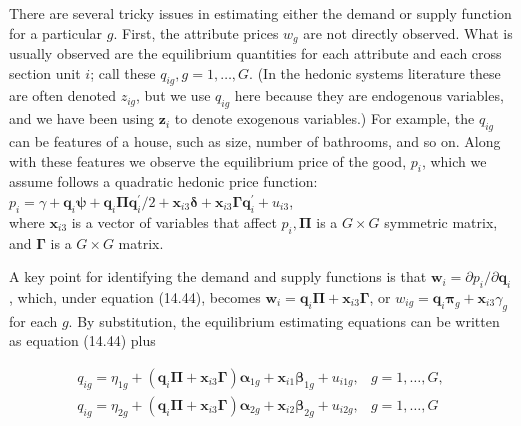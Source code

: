 \documentclass[10pt]{article}
\begin{document}
There are several tricky issues in estimating either the demand or supply function for a particular $g$. First, the attribute prices $w_{g}$ are not directly observed. What is usually observed are the equilibrium quantities for each attribute and each cross section unit $i$; call these $q_{i g}, g=1, \ldots, G$. (In the hedonic systems literature these are often denoted $z_{i g}$, but we use $q_{i g}$ here because they are endogenous variables, and we have been using $\mathbf{z}_{i}$ to denote exogenous variables.) For example, the $q_{i g}$ can be features of a house, such as size, number of bathrooms, and so on. Along with these features we observe the equilibrium price of the good, $p_{i}$, which we assume follows a quadratic hedonic price function:\\
$p_{i}=\gamma+\mathbf{q}_{i} \boldsymbol{\psi}+\mathbf{q}_{i} \boldsymbol{\Pi} \mathbf{q}_{i}^{\prime} / 2+\mathbf{x}_{i 3} \boldsymbol{\delta}+\mathbf{x}_{i 3} \boldsymbol{\Gamma} \mathbf{q}_{i}^{\prime}+u_{i 3}$,\\
where $\mathbf{x}_{i 3}$ is a vector of variables that affect $p_{i}, \boldsymbol{\Pi}$ is a $G \times G$ symmetric matrix, and $\boldsymbol{\Gamma}$ is a $G \times G$ matrix.

A key point for identifying the demand and supply functions is that $\mathbf{w}_{i}=\partial p_{i} / \partial \mathbf{q}_{i}$, which, under equation (14.44), becomes $\mathbf{w}_{i}=\mathbf{q}_{i} \boldsymbol{\Pi}+\mathbf{x}_{i 3} \boldsymbol{\Gamma}$, or $w_{i g}=\mathbf{q}_{i} \boldsymbol{\pi}_{g}+\mathbf{x}_{i 3} \gamma_{g}$ for each $g$. By substitution, the equilibrium estimating equations can be written as equation (14.44) plus

\[
\begin{array}{ll}
q_{i g}=\eta_{1 g}+\left(\mathbf{q}_{i} \boldsymbol{\Pi}+\mathbf{x}_{i 3} \boldsymbol{\Gamma}\right) \boldsymbol{\alpha}_{1 g}+\mathbf{x}_{i 1} \boldsymbol{\beta}_{1 g}+u_{i 1 g}, & g=1, \ldots, G, \\
q_{i g}=\eta_{2 g}+\left(\mathbf{q}_{i} \boldsymbol{\Pi}+\mathbf{x}_{i 3} \boldsymbol{\Gamma}\right) \boldsymbol{\alpha}_{2 g}+\mathbf{x}_{i 2} \boldsymbol{\beta}_{2 g}+u_{i 2 g}, & g=1, \ldots, G \tag{14.46}
\end{array}
\]
\end{document}
